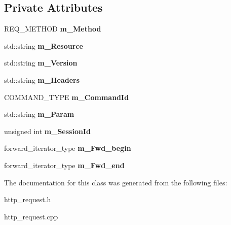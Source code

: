 \subsection*{\-Private \-Attributes}
\begin{DoxyCompactItemize}
\item 
\hypertarget{classhttp__server_1_1cRequest_a4702912c2025f7ce153f9ac68567b55c}{
\-R\-E\-Q\-\_\-\-M\-E\-T\-H\-O\-D {\bfseries m\-\_\-\-Method}}
\label{classhttp__server_1_1cRequest_a4702912c2025f7ce153f9ac68567b55c}

\item 
\hypertarget{classhttp__server_1_1cRequest_a4bd223196a1aa78de6ff2de4202232fa}{
std\-::string {\bfseries m\-\_\-\-Resource}}
\label{classhttp__server_1_1cRequest_a4bd223196a1aa78de6ff2de4202232fa}

\item 
\hypertarget{classhttp__server_1_1cRequest_ab64ead387c97768aabc1bed343731153}{
std\-::string {\bfseries m\-\_\-\-Version}}
\label{classhttp__server_1_1cRequest_ab64ead387c97768aabc1bed343731153}

\item 
\hypertarget{classhttp__server_1_1cRequest_aa1e6a65858e9cf26432add99470e4104}{
std\-::string {\bfseries m\-\_\-\-Headers}}
\label{classhttp__server_1_1cRequest_aa1e6a65858e9cf26432add99470e4104}

\item 
\hypertarget{classhttp__server_1_1cRequest_a2481a39733ba13124de865b30598a310}{
\-C\-O\-M\-M\-A\-N\-D\-\_\-\-T\-Y\-P\-E {\bfseries m\-\_\-\-Command\-Id}}
\label{classhttp__server_1_1cRequest_a2481a39733ba13124de865b30598a310}

\item 
\hypertarget{classhttp__server_1_1cRequest_a5320d5862827483c3f72c4fb385bcb16}{
std\-::string {\bfseries m\-\_\-\-Param}}
\label{classhttp__server_1_1cRequest_a5320d5862827483c3f72c4fb385bcb16}

\item 
\hypertarget{classhttp__server_1_1cRequest_a9c32df40a547799225a5ec41099fde53}{
unsigned int {\bfseries m\-\_\-\-Session\-Id}}
\label{classhttp__server_1_1cRequest_a9c32df40a547799225a5ec41099fde53}

\item 
\hypertarget{classhttp__server_1_1cRequest_a346ff4a99509f28178aa3702a877d438}{
forward\-\_\-iterator\-\_\-type {\bfseries m\-\_\-\-Fwd\-\_\-begin}}
\label{classhttp__server_1_1cRequest_a346ff4a99509f28178aa3702a877d438}

\item 
\hypertarget{classhttp__server_1_1cRequest_ad9fb0f78ed6fca01cdcdc6b3b01ba519}{
forward\-\_\-iterator\-\_\-type {\bfseries m\-\_\-\-Fwd\-\_\-end}}
\label{classhttp__server_1_1cRequest_ad9fb0f78ed6fca01cdcdc6b3b01ba519}

\end{DoxyCompactItemize}


\-The documentation for this class was generated from the following files\-:\begin{DoxyCompactItemize}
\item 
http\-\_\-request.\-h\item 
http\-\_\-request.\-cpp\end{DoxyCompactItemize}
